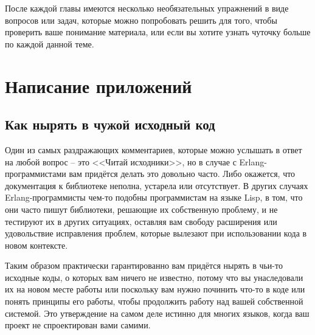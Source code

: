 \documentclass[11pt, oneside]{book}   	%
\begin{document}
После каждой главы имеются несколько необязательных упражнений в виде вопросов или задач, которые можно попробовать решить для того, чтобы проверить ваше понимание материала, или если вы хотите узнать чуточку больше по каждой данной теме.

\part{Написание приложений}
\label{part:writing-applications}

\chapter{Как нырять в чужой исходный код}
\label{chap:how-to-dive-into-a-code-base}

Один из самых раздражающих комментариев, которые можно услышать в ответ на любой вопрос -- это <<Читай исходники>>, но в случае с Erlang-программистами вам придётся делать это довольно часто. Либо окажется, что документация к библиотеке неполна, устарела или отсутствует. В других случаях Erlang-программисты чем-то подобны программистам на языке Lisp, в том, что они часто пишут библиотеки, решающие их собственную проблему, и не тестируют их в других ситуациях, оставляя вам свободу расширения или удовольствие исправления проблем, которые вылезают при использовании кода в новом контексте.

Таким образом практически гарантированно вам придётся нырять в чьи-то исходные коды, о которых вам ничего не известно, потому что вы унаследовали их на новом месте работы или поскольку вам нужно починить что-то в коде или понять принципы его работы, чтобы продолжить работу над вашей собственной системой. Это утверждение на самом деле истинно для многих языков, когда ваш проект не спроектирован вами самими.
\end{document}
